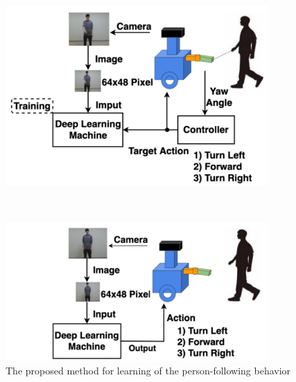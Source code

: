   \begin{figure}[h]
    \centering
    \begin{minipage}[c]{100mm} 
        \centering
        \includegraphics[width=100mm]{images/okada_learning_phase_system.png}
    \end{minipage} \\
    \vspace{1em} %
    \begin{minipage}[c]{100mm} 
        \centering
        \includegraphics[width=100mm]{images/okada_following_phase_system.png}
    \end{minipage}
    \caption{The proposed method for learning of the person-following behavior\cite{okada}}
    \label{Fig:okada_system}
  \end{figure}

\newpage
